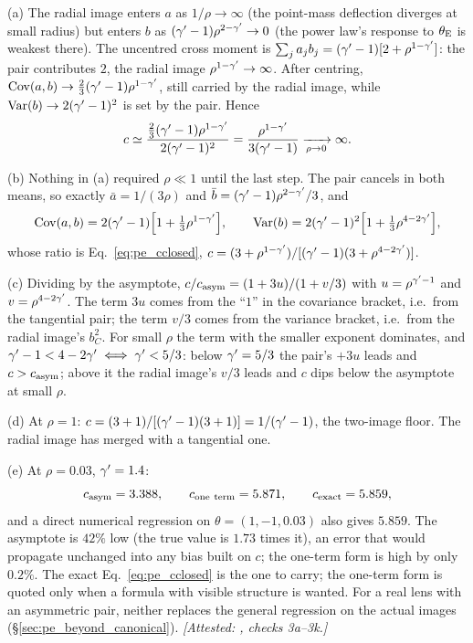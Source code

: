 (a) The radial image enters $a$ as $1/\rho\to\infty$ (the
point-mass deflection diverges at small radius) but enters $b$ as
$(\gamma'-1)\rho^{2-\gamma'}\to0$ (the power law's response to $\theta_{\mathrm{E}}$ is
weakest there). The uncentred cross moment is
$\sum_ja_jb_j=(\gamma'-1)[2+\rho^{1-\gamma'}]$: the pair contributes $2$, the
radial image $\rho^{1-\gamma'}\to\infty$. After centring,
$\operatorname{Cov}(a,b)\to\tfrac23(\gamma'-1)\rho^{1-\gamma'}$, still carried by
the radial image, while $\operatorname{Var}(b)\to2(\gamma'-1)^2$ is set by
the pair. Hence
\[
  c\simeq\frac{\tfrac23(\gamma'-1)\rho^{1-\gamma'}}{2(\gamma'-1)^2}
  =\frac{\rho^{1-\gamma'}}{3(\gamma'-1)}\xrightarrow[\rho\to0]{}\infty .
\]

(b) Nothing in (a) required $\rho\ll1$ until the last step.
The pair cancels in both means, so exactly $\bar a=1/(3\rho)$ and
$\bar b=(\gamma'-1)\rho^{2-\gamma'}/3$, and
\[
  \operatorname{Cov}(a,b)=2(\gamma'-1)\Bigl[1+\tfrac13\rho^{1-\gamma'}\Bigr],
  \qquad
  \operatorname{Var}(b)=2(\gamma'-1)^2\Bigl[1+\tfrac13\rho^{4-2\gamma'}\Bigr],
\]
whose ratio is Eq.~\eqref{eq:pe_cclosed},
$c=(3+\rho^{1-\gamma'})/[(\gamma'-1)(3+\rho^{4-2\gamma'})]$.

(c) Dividing by the asymptote,
$c/c_{\rm asym}=(1+3u)/(1+v/3)$ with $u=\rho^{\gamma'-1}$ and
$v=\rho^{4-2\gamma'}$. The term $3u$ comes from the ``$1$'' in the
covariance bracket, i.e.\ from the tangential pair; the term $v/3$ comes
from the variance bracket, i.e.\ from the radial image's $b_C^2$. For
small $\rho$ the term with the smaller exponent dominates, and
$\gamma'-1<4-2\gamma'\iff\gamma'<5/3$: below $\gamma'=5/3$ the pair's $+3u$ leads and
$c>c_{\rm asym}$; above it the radial image's $v/3$ leads and $c$ dips
below the asymptote at small $\rho$.

(d) At $\rho=1$: $c=(3+1)/[(\gamma'-1)(3+1)]=1/(\gamma'-1)$, the
two-image floor. The radial image has merged with a tangential one.

(e) At $\rho=0.03$, $\gamma'=1.4$:
\[
  c_{\rm asym}=3.388,\qquad
  c_{\rm one\ term}=5.871,\qquad
  c_{\rm exact}=5.859,
\]
and a direct numerical regression on $\theta=(1,-1,0.03)$ also gives
$5.859$. The asymptote is $42\%$ low (the true value is $1.73$ times
it), an error that would propagate unchanged into any bias built on
$c$; the one-term form is high by only $0.2\%$. The exact
Eq.~\eqref{eq:pe_cclosed} is the one to carry; the one-term form is
quoted only when a formula with visible structure is wanted. For a real lens with an asymmetric
pair, neither replaces the general regression on the actual images
(\S\ref{sec:pe_beyond_canonical}).
\emph{[Attested: , checks 3a--3k.]}

